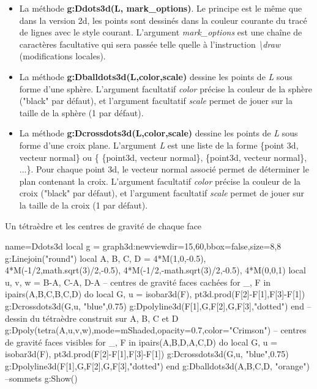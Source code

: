 \begin{itemize}
    \item La méthode \textbf{g:Ddots3d(L, mark\_options)}. Le principe est le même que dans la version 2d, les points sont dessinés dans la couleur courante du tracé de lignes avec le style courant. L'argument \emph{mark\_options} est une chaîne de caractères facultative qui sera passée telle quelle à l'instruction \emph{\textbackslash draw} (modifications locales).
    
    \item La méthode \textbf{g:Dballdots3d(L,color,scale)} dessine les points de \emph{L} sous forme d'une sphère. L'argument facultatif \emph{color} précise la couleur de la sphère ("black" par défaut), et l'argument facultatif \emph{scale} permet de jouer sur la taille de la sphère (1 par défaut).
    
    \item La méthode \textbf{g:Dcrossdots3d(L,color,scale)} dessine les points de \emph{L} sous forme d'une croix plane. L'argument \emph{L} est une liste de la forme \{point 3d, vecteur normal\} ou \{ \{point3d, vecteur normal\}, \{point3d, vecteur normal\}, ...\}. Pour chaque point 3d, le vecteur normal associé permet de déterminer le plan contenant la croix. L'argument facultatif \emph{color} précise la couleur de la croix ("black" par défaut), et l'argument facultatif \emph{scale} permet de jouer sur la taille de la croix (1 par défaut).
\end{itemize}

\begin{demo}{Un tétraèdre et les centres de gravité de chaque face}
\begin{luadraw}{name=Ddots3d}
local g = graph3d:new{viewdir={15,60},bbox=false,size={8,8}}
g:Linejoin("round")
local A, B, C, D = 4*M(1,0,-0.5), 4*M(-1/2,math.sqrt(3)/2,-0.5), 4*M(-1/2,-math.sqrt(3)/2,-0.5), 4*M(0,0,1)
local u, v, w = B-A, C-A, D-A
-- centres de gravité faces cachées
for _, F in ipairs({{A,B,C},{B,C,D}}) do
    local G, u = isobar3d(F), pt3d.prod(F[2]-F[1],F[3]-F[1])
    g:Dcrossdots3d({G,u}, "blue",0.75)
    g:Dpolyline3d({{F[1],G,F[2]},{G,F[3]}},"dotted")
end
-- dessin du tétraèdre construit sur A, B, C et D
g:Dpoly(tetra(A,u,v,w),{mode=mShaded,opacity=0.7,color="Crimson"})
-- centres de gravité faces visibles
for _, F in ipairs({{A,B,D},{A,C,D}}) do
    local G, u = isobar3d(F), pt3d.prod(F[2]-F[1],F[3]-F[1])
    g:Dcrossdots3d({G,u}, "blue",0.75)
    g:Dpolyline3d({{F[1],G,F[2]},{G,F[3]}},"dotted")
end
g:Dballdots3d({A,B,C,D}, "orange") --sommets
g:Show()
\end{luadraw}
\end{demo}

